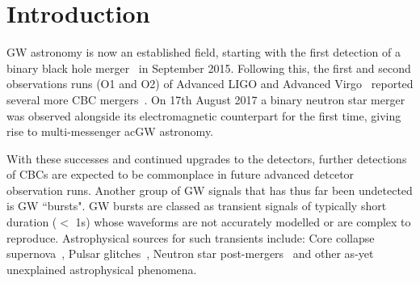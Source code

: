 \documentclass[12pt]{iopart}
\begin{document}
\section{Introduction}

%
\ac{GW} astronomy is now an established field, starting with the first
detection of a binary black hole merger~\cite{Abbott2016} in September 2015.
Following this, the first and second observations runs (O1 and O2) of Advanced
LIGO and Advanced Virgo~\cite{Prospects-dets, AdvLIGO, AdvLIGO2, AdvVIRGO}
reported several more \ac{CBC} mergers~\cite{Abbott2016a, Abbott2017,
Abbott2017a, Abbott2017b}. On 17th August 2017 a binary neutron star merger was
observed alongside its electromagnetic counterpart for the first time, giving
rise to multi-messenger ac{GW} astronomy. 

%
With these successes and continued upgrades to the detectors, further
detections of \acp{CBC} are expected to be commonplace in future advanced
detcetor observation runs. Another group of \ac{GW} signals that has thus far
been undetected is \ac{GW} ``bursts". \ac{GW} bursts are classed as transient
signals of typically short duration ($<$ 1s) whose waveforms are not accurately
modelled or are complex to reproduce. Astrophysical sources for such transients
include: Core collapse supernova~\cite{Fryer_2003}, Pulsar
glitches~\cite{Andersson_2001}, Neutron star post-mergers~\cite{Baiotti_2007}
and other as-yet unexplained astrophysical phenomena. 
\end{document}
